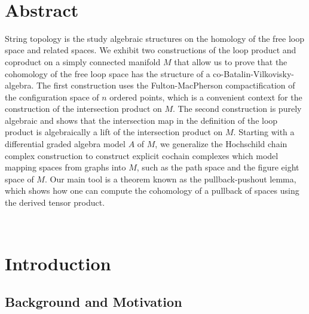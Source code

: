 \documentclass{scrartcl}
\theoremstyle{plain}
\theoremstyle{definition}
\begin{document}
\pagestyle{plain}
\makeTitel

\newpage~
\newpage




\section*{Abstract}
String topology is the study algebraic structures on the homology of the free loop space and related spaces. We exhibit two constructions of the loop product and coproduct on a simply connected manifold $M$ that allow us to prove that the cohomology of the free loop space has the structure of a co-Batalin-Vilkovisky-algebra. The first construction uses the Fulton-MacPherson compactification of the configuration space of $n$ ordered points, which is a convenient context for the construction of the intersection product on $M$. The second construction is purely algebraic and shows that the intersection map in the definition of the loop product is algebraically a lift of the intersection product on $M$. Starting with a differential graded algebra model $A$ of $M$, we generalize the Hochschild chain complex construction to construct explicit cochain complexes which model mapping spaces from graphs into $M$, such as the path space and the figure eight space of $M$. Our main tool is a theorem known as the pullback-pushout lemma, which shows how one can compute the cohomology of a pullback of spaces using the derived tensor product. 

\restoregeometry

\newpage



\tableofcontents

\newpage~
\cleardoublepage



\newpage


\section{Introduction}

\subsection{Background and Motivation}
\end{document}
